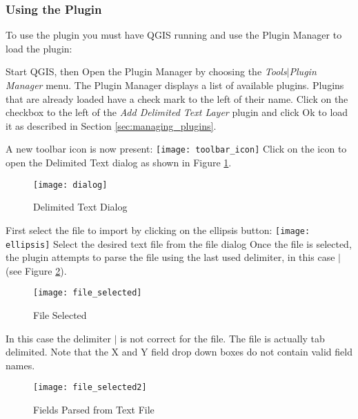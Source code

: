 \subsubsection{Using the Plugin}
To use the plugin you must have QGIS running and use the Plugin Manager to
load the plugin:

Start QGIS, then Open the Plugin Manager by choosing the {\em
Tools\mbox{$|$}Plugin Manager} menu. The Plugin Manager displays a list of
available plugins. Plugins that are already loaded have a check mark to the
left of their name. Click on the checkbox to the left of the {\em Add
Delimited Text Layer} plugin and click Ok to load it as described in Section
\ref{sec:managing_plugins}.


A new toolbar icon is now present:
\texttt{[image: toolbar\_icon]}
Click on the icon to open the Delimited Text dialog as shown in Figure
\ref{fig:delim_text_plugin_dialog}.

\begin{figure}[ht]
   \begin{center}
   \caption{Delimited Text
Dialog}\label{fig:delim_text_plugin_dialog}\smallskip
\texttt{[image: dialog]}            
   \end{center}  
\end{figure}

First select the file to import by clicking on the ellipsis button: 
\texttt{[image: ellipsis]}
Select the desired text file from the file dialog
Once the file is selected, the plugin attempts to parse the file using the
last used delimiter, in this case \mbox{$|$} (see Figure
\ref{fig:delim_text_file_selected}).

\begin{figure}[ht]
   \begin{center}
   \caption{File Selected}\label{fig:delim_text_file_selected}\smallskip
\texttt{[image: file\_selected]}   
   \end{center}  
\end{figure}
  
In this case the delimiter \mbox{$|$} is not correct for the file. The file is
actually tab delimited. Note that the X and Y field drop down boxes do not
contain valid field names.

\begin{figure}[ht]
   \begin{center}
   \caption{Fields Parsed from Text
File}\label{fig:delim_text_file_selected2}\smallskip  
\texttt{[image: file\_selected2]}
   \end{center}  
\end{figure}

